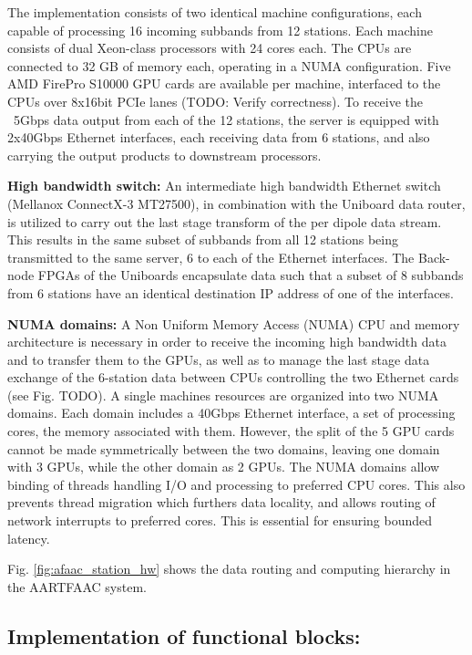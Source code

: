 \documentclass{ws-jai}
\begin{document}
The  implementation  consists  of  two identical  machine  configurations,  each
capable  of processing  16  incoming  subbands from  12  stations. Each  machine
consists  of  dual Xeon-class  processors  with  24  cores  each. The  CPUs  are
connected to 32 GB  of memory each, operating in a  NUMA configuration. Five AMD
FirePro S10000 GPU cards are available  per machine, interfaced to the CPUs over
8x16bit PCIe lanes (TODO: Verify correctness). To receive the ~5Gbps data output
from each  of the 12 stations,  the server is equipped  with 2x40Gbps Ethernet
interfaces, each  receiving data from 6  stations, and also carrying  the output
products to downstream processors.

\noindent  \textbf  {High  bandwidth  switch:} An  intermediate  high  bandwidth
Ethernet switch (Mellanox ConnectX-3 MT27500),  in combination with the Uniboard
data router, is utilized to carry out the last stage transform of the per dipole
data stream. This  results in the same  subset of subbands from  all 12 stations
being transmitted to the same server, 6 to each of the Ethernet interfaces.  The
Back-node  FPGAs of  the Uniboards  encapsulate  data such  that a  subset of  8
subbands from 6 stations have an identical  destination IP address of one of the
interfaces.

\noindent \textbf  {NUMA domains:} A  Non Uniform  Memory Access (NUMA)  CPU and
memory architecture is necessary in order to receive the incoming high bandwidth
data and to transfer them to the GPUs,  as well as to manage the last stage data
exchange of the  6-station data between CPUs controlling the  two Ethernet cards
(see  Fig. TODO).   A  single machines  resources are  organized  into two  NUMA
domains.  Each domain includes a 40Gbps  Ethernet interface, a set of processing
cores, the memory  associated with them. However,  the split of the  5 GPU cards
cannot be made symmetrically between the  two domains, leaving one domain with 3
GPUs, while  the other  domain as  2 GPUs.   The NUMA  domains allow  binding of
threads handling I/O and processing to  preferred CPU cores.  This also prevents
thread migration  which furthers  data locality, and  allows routing  of network
interrupts to preferred cores. This is essential for ensuring bounded latency.

Fig. \ref{fig:afaac_station_hw}  shows the data routing  and computing hierarchy
in the AARTFAAC system.

\subsection {Implementation of functional  blocks:} 
\end{document}
